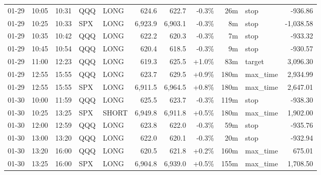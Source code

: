 \documentclass[11pt,a4paper,twoside]{article}
\begin{document}
\begin{center}
\begin{longtable}{>{\color{txtmain}}l l l l l r r r r >{\color{txtmain}}l r}
01-29 & 10:05 & 10:31 & QQQ & LONG & 624.6 & 622.7 & \textcolor{lossred}{-0.3\%} & 26m & stop & \textcolor{lossred}{-936.86} \\
01-29 & 10:25 & 10:33 & SPX & LONG & 6,923.9 & 6,903.1 & \textcolor{lossred}{-0.3\%} & 8m & stop & \textcolor{lossred}{-1,038.58} \\
01-29 & 10:35 & 10:42 & QQQ & LONG & 622.2 & 620.3 & \textcolor{lossred}{-0.3\%} & 7m & stop & \textcolor{lossred}{-933.32} \\
01-29 & 10:45 & 10:54 & QQQ & LONG & 620.4 & 618.5 & \textcolor{lossred}{-0.3\%} & 9m & stop & \textcolor{lossred}{-930.57} \\
01-29 & 11:00 & 12:23 & QQQ & LONG & 619.3 & 625.5 & \textcolor{wingreen}{+1.0\%} & 83m & target & \textcolor{wingreen}{3,096.30} \\
01-29 & 12:55 & 15:55 & QQQ & LONG & 623.7 & 629.5 & \textcolor{wingreen}{+0.9\%} & 180m & max\_time & \textcolor{wingreen}{2,934.99} \\
01-29 & 12:55 & 15:55 & SPX & LONG & 6,911.5 & 6,964.5 & \textcolor{wingreen}{+0.8\%} & 180m & max\_time & \textcolor{wingreen}{2,647.01} \\
01-30 & 10:00 & 11:59 & QQQ & LONG & 625.5 & 623.7 & \textcolor{lossred}{-0.3\%} & 119m & stop & \textcolor{lossred}{-938.30} \\
01-30 & 10:25 & 13:25 & SPX & SHORT & 6,949.8 & 6,911.8 & \textcolor{wingreen}{+0.5\%} & 180m & max\_time & \textcolor{wingreen}{1,902.00} \\
01-30 & 12:00 & 12:59 & QQQ & LONG & 623.8 & 622.0 & \textcolor{lossred}{-0.3\%} & 59m & stop & \textcolor{lossred}{-935.76} \\
01-30 & 13:00 & 13:20 & QQQ & LONG & 622.0 & 620.1 & \textcolor{lossred}{-0.3\%} & 20m & stop & \textcolor{lossred}{-932.94} \\
01-30 & 13:20 & 16:00 & QQQ & LONG & 620.5 & 621.8 & \textcolor{wingreen}{+0.2\%} & 160m & max\_time & \textcolor{wingreen}{675.01} \\
01-30 & 13:25 & 16:00 & SPX & LONG & 6,904.8 & 6,939.0 & \textcolor{wingreen}{+0.5\%} & 155m & max\_time & \textcolor{wingreen}{1,708.50} \\
\end{longtable}
\end{center}
\clearpage
\end{document}
